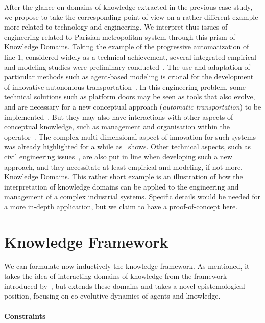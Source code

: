 \documentclass[runningheads,a4paper]{llncs2e/llncs}
\begin{document}
After the glance on domains of knowledge extracted in the previous case study, we propose to take the corresponding point of view on a rather different example more related to technology and engineering. We interpret thus issues of engineering related to Parisian metropolitan system through this prism of Knowledge Domains. Taking the example of the progressive automatization of line 1, considered widely as a technical achievement, several integrated empirical and modeling studies were preliminary conducted~\cite{belmonte2008automatisation}. The use and adaptation of particular methods such as agent-based modeling is crucial for the development of innovative autonomous transportation~\cite{balbo2016positionnement}. In this engineering problem, some technical solutions such as platform doors may be seen as tools that also evolve, and are necessary for a new conceptual approach (\emph{automatic transportation}) to be implemented~\cite{foot2005faut}. But they may also have interactions with other aspects of conceptual knowledge, such as management and organisation within the operator~\cite{foot1994ratp}. The complex multi-dimensional aspect of innovation for such systems was already highlighted for a while as~\cite{hatchuel1988stations} shows. Other technical aspects, such as civil engineering issues~\cite{moreno2016etude}, are also put in line when developing such a new approach, and they necessitate at least empirical and modeling, if not more, Knowledge Domains. This rather short example is an illustration of how the interpretation of knowledge domains can be applied to the engineering and management of a complex industrial systems. Specific details would be needed for a more in-depth application, but we claim to have a proof-of-concept here.




\section{Knowledge Framework}


We can formulate now inductively the knowledge framework. As mentioned, it takes the idea of interacting domains of knowledge from the framework introduced by~\cite{livet2010}, but extends these domains and takes a novel epistemological position, focusing on co-evolutive dynamics of agents and knowledge.


\paragraph{Constraints}
\end{document}

